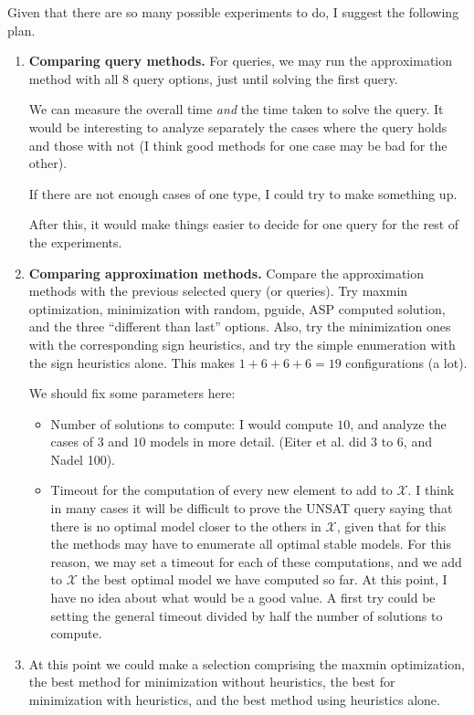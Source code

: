 \documentclass[a4paper,10pt]{article}
\begin{document}
Given that there are so many possible experiments to do, 
I suggest the following plan.

\begin{enumerate}
\item
\textbf{Comparing query methods.}
For queries, we may run the approximation method with all 8 query options, 
just until solving the first query.

We can measure the overall time \emph{and} the time taken to solve the query.
It would be interesting to analyze separately the cases where the query holds and those with not
(I think good methods for one case may be bad for the other). 

If there are not enough cases of one type, I could try to make something up. 

After this, it would make things easier to decide for one query for the rest of the experiments.

\item
\textbf{Comparing approximation methods.}
Compare the approximation methods with the previous selected query (or queries).
Try maxmin optimization, minimization with random, pguide, ASP computed solution, and the three ``different than last'' options.
Also, try the minimization ones with the corresponding sign heuristics, 
and try the simple enumeration with the sign heuristics alone.
This makes $1 + 6 + 6 + 6 = 19$ configurations (a lot).

We should fix some parameters here:
    \begin{itemize}
    \item
    Number of solutions to compute: I would compute $10$, and analyze the cases of $3$ and $10$ models in more detail.
    (Eiter et al. did 3 to 6, and Nadel 100).
    \item
    Timeout for the computation of every new element to add to $\mathcal{X}$. 
    I think in many cases it will be difficult to prove the UNSAT query
    saying that there is no optimal model closer to the others in $\mathcal{X}$, 
    given that for this the methods may have to enumerate all optimal stable models.
    For this reason, we may set a timeout for each of these computations, 
    and we add to $\mathcal{X}$ the best optimal model we have computed so far.
    At this point, I have no idea about what would be a good value.
    A first try could be setting the general timeout divided by half the number of solutions to compute.
    \end{itemize}


\item
At this point we could make a selection comprising the maxmin optimization, 
the best method for minimization without heuristics, the best for minimization with heuristics, 
and the best method using heuristics alone.


\end{enumerate}
\end{document}
